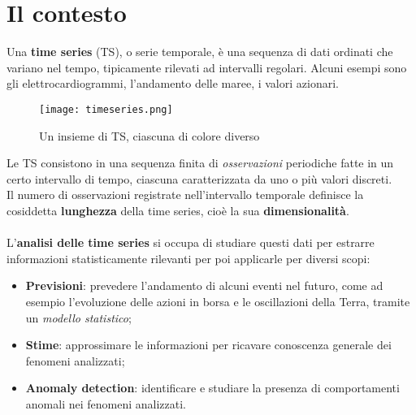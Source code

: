 \section{Il contesto}
Una \textbf{time series} (TS), o serie temporale, è una sequenza di dati ordinati che variano nel tempo, tipicamente rilevati ad intervalli regolari. Alcuni esempi sono gli elettrocardiogrammi, l'andamento delle maree, i valori azionari.
\begin{figure}[H]
	\centering
	\texttt{[image: timeseries.png]}
	\caption{Un insieme di TS, ciascuna di colore diverso}
	\label{fig:timeseries}
\end{figure}
Le TS consistono in una sequenza finita di \textit{osservazioni} periodiche fatte in un certo intervallo di tempo, ciascuna caratterizzata da uno o più valori discreti.\\
Il numero di osservazioni registrate nell'intervallo temporale definisce la cosiddetta \textbf{lunghezza} della time series, cioè la sua \textbf{dimensionalità}.\\
\\
L'\textbf{analisi delle time series} si occupa di studiare questi dati per estrarre informazioni statisticamente rilevanti per poi applicarle per diversi scopi:
\begin{itemize}
	\item \textbf{Previsioni}: prevedere l'andamento di alcuni eventi nel futuro, come ad esempio l'evoluzione delle azioni in borsa e le oscillazioni della Terra, tramite un \textit{modello statistico};
	\item \textbf{Stime}: approssimare le informazioni per ricavare conoscenza generale dei fenomeni analizzati;
	\item \textbf{Anomaly detection}: identificare e studiare la presenza di comportamenti anomali nei fenomeni analizzati.
\end{itemize}

